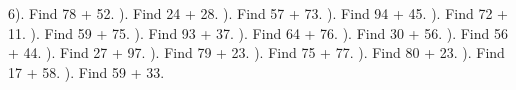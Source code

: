 \documentclass{article}%
\begin{document}
6). Find 78 + 52.%
\newline%
\newline%
). Find 24 + 28.%
\newline%
\newline%
). Find 57 + 73.%
\newline%
\newline%
). Find 94 + 45.%
\newline%
\newline%
). Find 72 + 11.%
\newline%
\newline%
). Find 59 + 75.%
\newline%
\newline%
). Find 93 + 37.%
\newline%
\newline%
). Find 64 + 76.%
\newline%
\newline%
). Find 30 + 56.%
\newline%
\newline%
). Find 56 + 44.%
\newline%
\newline%
). Find 27 + 97.%
\newline%
\newline%
). Find 79 + 23.%
\newline%
\newline%
). Find 75 + 77.%
\newline%
\newline%
). Find 80 + 23.%
\newline%
\newline%
). Find 17 + 58.%
\newline%
\newline%
). Find 59 + 33.%
\newline%
\end{document}
